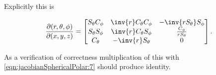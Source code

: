 Explicitly this is

\begin{align}\label{eqn:jacobianSphericalPolar:18}
\frac{\partial (r,\theta,\phi)}{\partial (x, y, z)}
=
\begin{bmatrix}
S_\theta C_\phi & \inv{r} C_\theta C_\phi & -\inv{r S_\theta} S_\phi \\
S_\theta S_\phi & \inv{r} C_\theta S_\phi & \frac{C_\phi}{r S_\theta} \\
C_\theta        & -\inv{r} S_\theta       &  0
\end{bmatrix}.
\end{align} 

As a verification of correctness multiplication of this with \ref{eqn:jacobianSphericalPolar:7} should produce identity.

\EndNoBibArticle
